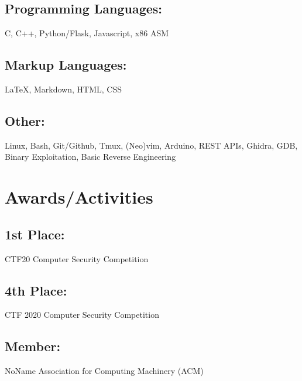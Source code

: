 \documentclass{article}
\begin{document}
\subsection{Programming Languages:}
C, C++, Python/Flask, Javascript, x86 ASM
\subsection{Markup Languages:}
{\LaTeX}, Markdown, HTML, CSS
\subsection{Other:}
Linux, Bash, Git/Github, Tmux, (Neo)vim, Arduino, REST APIs, Ghidra, GDB, Binary Exploitation, Basic Reverse Engineering

\section{Awards/Activities}
\subsection{1st Place: } CTF20 Computer Security Competition
\subsection{4th Place: } CTF 2020 Computer Security Competition
\subsection{Member: } NoName Association for Computing Machinery (ACM)
\end{document}

